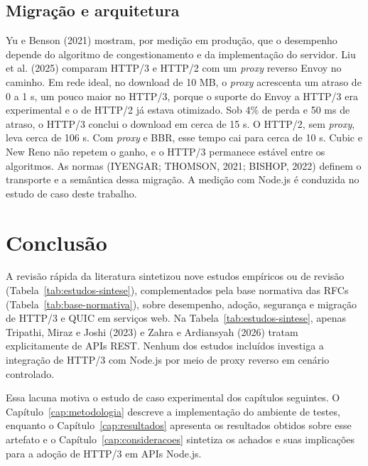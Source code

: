 \subsection{Migração e arquitetura}

Yu e Benson (2021) mostram, por medição em produção, que o desempenho depende do algoritmo de congestionamento e da implementação do servidor. Liu et al. (2025) comparam HTTP/3 e HTTP/2 com um \textit{proxy} reverso Envoy no caminho. Em rede ideal, no download de 10 MB, o \textit{proxy} acrescenta um atraso de 0 a 1 s, um pouco maior no HTTP/3, porque o suporte do Envoy a HTTP/3 era experimental e o de HTTP/2 já estava otimizado. Sob 4\% de perda e 50 ms de atraso, o HTTP/3 conclui o download em cerca de 15 s. O HTTP/2, sem \textit{proxy}, leva cerca de 106 s. Com \textit{proxy} e BBR, esse tempo cai para cerca de 10 s. Cubic e New Reno não repetem o ganho, e o HTTP/3 permanece estável entre os algoritmos. As normas (IYENGAR; THOMSON, 2021; BISHOP, 2022) definem o transporte e a semântica dessa migração. A medição com Node.js é conduzida no estudo de caso deste trabalho.

\section{Conclusão}

A revisão rápida da literatura sintetizou nove estudos empíricos ou de revisão (Tabela~\ref{tab:estudos-sintese}), complementados pela base normativa das RFCs (Tabela~\ref{tab:base-normativa}), sobre desempenho, adoção, segurança e migração de HTTP/3 e QUIC em serviços web. Na Tabela~\ref{tab:estudos-sintese}, apenas Tripathi, Miraz e Joshi (2023) e Zahra e Ardiansyah (2026) tratam explicitamente de APIs REST. Nenhum dos estudos incluídos investiga a integração de HTTP/3 com Node.js por meio de proxy reverso em cenário controlado.

Essa lacuna motiva o estudo de caso experimental dos capítulos seguintes. O Capítulo~\ref{cap:metodologia} descreve a implementação do ambiente de testes, enquanto o Capítulo~\ref{cap:resultados} apresenta os resultados obtidos sobre esse artefato e o Capítulo~\ref{cap:consideracoes} sintetiza os achados e suas implicações para a adoção de HTTP/3 em APIs Node.js.

